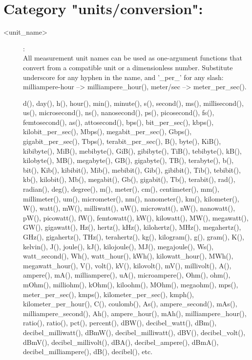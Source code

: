 \section{Category "units/conversion":}
\label{sec:ned-functions:category-units-conversion}

\begin{description}
\item[<unit\_name>]:  \\
    All measurement unit names can be used as one-argument functions that
    convert from a compatible unit or a dimensionless number. Substitute
    underscore for any hyphen in the name, and '\_per\_' for any slash:
    milliampere-hour --> milliampere\_hour(), meter/sec --> meter\_per\_sec().
    
    d(), day(), h(), hour(), min(), minute(), s(), second(), ms(),
    millisecond(), us(), microsecond(), ns(), nanosecond(), ps(), picosecond(),
    fs(), femtosecond(), as(), attosecond(), bps(), bit\_per\_sec(), kbps(),
    kilobit\_per\_sec(), Mbps(), megabit\_per\_sec(), Gbps(), gigabit\_per\_sec(),
    Tbps(), terabit\_per\_sec(), B(), byte(), KiB(), kibibyte(), MiB(),
    mebibyte(), GiB(), gibibyte(), TiB(), tebibyte(), kB(), kilobyte(), MB(),
    megabyte(), GB(), gigabyte(), TB(), terabyte(), b(), bit(), Kib(),
    kibibit(), Mib(), mebibit(), Gib(), gibibit(), Tib(), tebibit(), kb(),
    kilobit(), Mb(), megabit(), Gb(), gigabit(), Tb(), terabit(), rad(),
    radian(), deg(), degree(), m(), meter(), cm(), centimeter(), mm(),
    millimeter(), um(), micrometer(), nm(), nanometer(), km(), kilometer(),
    W(), watt(), mW(), milliwatt(), uW(), microwatt(), nW(), nanowatt(), pW(),
    picowatt(), fW(), femtowatt(), kW(), kilowatt(), MW(), megawatt(), GW(),
    gigawatt(), Hz(), hertz(), kHz(), kilohertz(), MHz(), megahertz(), GHz(),
    gigahertz(), THz(), terahertz(), kg(), kilogram(), g(), gram(), K(),
    kelvin(), J(), joule(), kJ(), kilojoule(), MJ(), megajoule(), Ws(),
    watt\_second(), Wh(), watt\_hour(), kWh(), kilowatt\_hour(), MWh(),
    megawatt\_hour(), V(), volt(), kV(), kilovolt(), mV(), millivolt(), A(),
    ampere(), mA(), milliampere(), uA(), microampere(), Ohm(), ohm(), mOhm(),
    milliohm(), kOhm(), kiloohm(), MOhm(), megaohm(), mps(), meter\_per\_sec(),
    kmps(), kilometer\_per\_sec(), kmph(), kilometer\_per\_hour(), C(), coulomb(),
    As(), ampere\_second(), mAs(), milliampere\_second(), Ah(), ampere\_hour(),
    mAh(), milliampere\_hour(), ratio(), ratio(), pct(), percent(), dBW(),
    decibel\_watt(), dBm(), decibel\_milliwatt(), dBmW(), decibel\_milliwatt(),
    dBV(), decibel\_volt(), dBmV(), decibel\_millivolt(), dBA(),
    decibel\_ampere(), dBmA(), decibel\_milliampere(), dB(), decibel(), etc.
\end{description}

